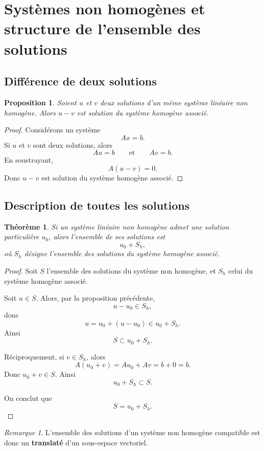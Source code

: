 \documentclass[11pt,a4paper]{article}
\newtheorem{theoreme}[definition]{Théorème}
\newtheorem{proposition}[definition]{Proposition}
\theoremstyle{remark}
\newtheorem{remarque}[definition]{Remarque}
\begin{document}
\section{Systèmes non homogènes et structure de l’ensemble des solutions}

\subsection{Différence de deux solutions}

\begin{proposition}
Soient \(u\) et \(v\) deux solutions d’un même système linéaire non homogène. Alors \(u-v\) est solution du système homogène associé.
\end{proposition}

\begin{proof}
Considérons un système
\[
A x=b.
\]
Si \(u\) et \(v\) sont deux solutions, alors
\[
Au=b
\qquad \text{et} \qquad
Av=b.
\]
En soustrayant,
\[
A(u-v)=0.
\]
Donc \(u-v\) est solution du système homogène associé.
\end{proof}

\subsection{Description de toutes les solutions}

\begin{theoreme}
Si un système linéaire non homogène admet une solution particulière \(u_0\), alors l’ensemble de ses solutions est
\[
u_0+S_h,
\]
où \(S_h\) désigne l’ensemble des solutions du système homogène associé.
\end{theoreme}

\begin{proof}
Soit \(S\) l’ensemble des solutions du système non homogène, et \(S_h\) celui du système homogène associé.

Soit \(u\in S\). Alors, par la proposition précédente,
\[
u-u_0\in S_h,
\]
donc
\[
u=u_0+(u-u_0)\in u_0+S_h.
\]
Ainsi
\[
S\subset u_0+S_h.
\]

Réciproquement, si \(v\in S_h\), alors
\[
A(u_0+v)=Au_0+Av=b+0=b.
\]
Donc \(u_0+v\in S\). Ainsi
\[
u_0+S_h\subset S.
\]

On conclut que
\[
S=u_0+S_h.
\]
\end{proof}

\begin{remarque}
L’ensemble des solutions d’un système non homogène compatible est donc un \textbf{translaté} d’un sous-espace vectoriel.
\end{remarque}
\end{document}

